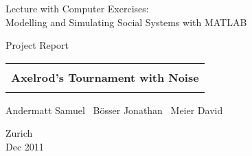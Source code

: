 
\thispagestyle{empty}

\begin{center}


\bigskip


\bigskip


\bigskip


\LARGE{ 	Lecture with Computer Exercises:\\ }
\LARGE{ Modelling and Simulating Social Systems with MATLAB\\}

\bigskip

\bigskip

\small{Project Report}\\

\bigskip

\bigskip

\bigskip

\bigskip


\begin{tabular}{|c|}
\hline
\\
\textbf{\LARGE{Axelrod's Tournament with Noise}}\\
\\
\hline
\end{tabular}
\bigskip

\bigskip

\bigskip

\LARGE{Andermatt Samuel \, B\"osser Jonathan \, Meier David}



\bigskip

\bigskip

\bigskip

\bigskip

\bigskip

\bigskip

\bigskip

\bigskip

Zurich\\
Dec 2011\\

\end{center}


